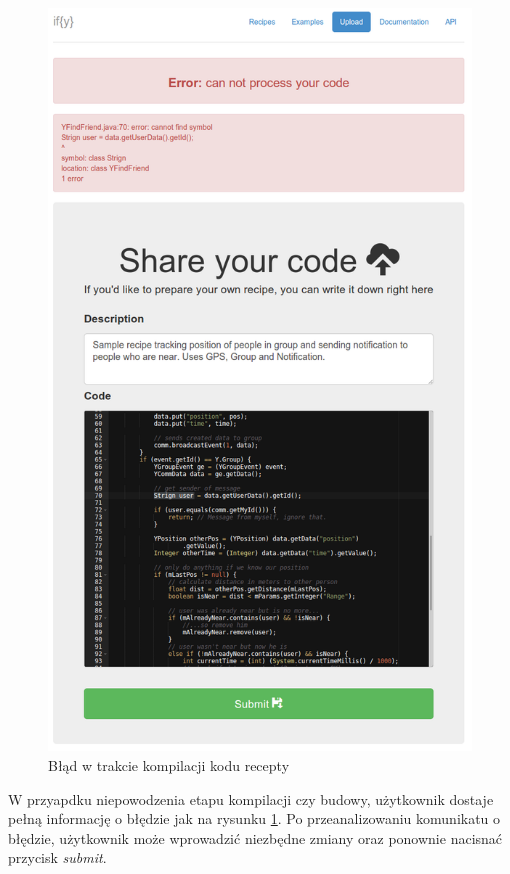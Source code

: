 \documentclass[11pt,a4paper,polish,thesis]{dcsbook}
\begin{document}
\begin{figure}[H]
  \centering
  \includegraphics[scale=0.4]{./resources/market_error.png}
  \caption{Błąd w trakcie kompilacji kodu recepty}
  \label{fig:market_error}
\end{figure}
W przyapdku niepowodzenia etapu kompilacji czy budowy, użytkownik
dostaje pełną informację o błędzie jak na rysunku \ref{fig:market_error}. Po przeanalizowaniu komunikatu o błędzie, użytkownik może wprowadzić niezbędne zmiany oraz
ponownie nacisnać przycisk \emph{submit}.
\end{document}

